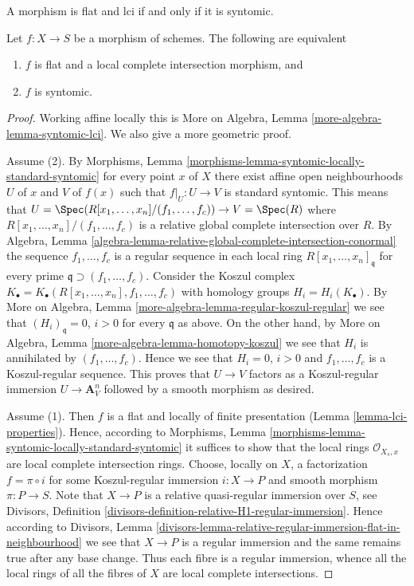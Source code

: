 \begin{lemma}
\label{lemma-flat-lci}
\begin{slogan}
A morphism is flat and lci if and only if it is syntomic.
\end{slogan}
Let $f : X \to S$ be a morphism of schemes.
The following are equivalent
\begin{enumerate}
\item $f$ is flat and a local complete intersection morphism, and
\item $f$ is syntomic.
\end{enumerate}
\end{lemma}

\begin{proof}
Working affine locally this is
More on Algebra, Lemma \ref{more-algebra-lemma-syntomic-lci}.
We also give a more geometric proof.

\medskip\noindent
Assume (2). By
Morphisms, Lemma \ref{morphisms-lemma-syntomic-locally-standard-syntomic}
for every point $x$ of $X$ there exist affine open neighbourhoods
$U$ of $x$ and $V$ of $f(x)$ such that $f|_U : U \to V$ is standard syntomic.
This means that $U = \Spec(R[x_1, \ldots, x_n]/(f_1, \ldots, f_c))
\to V = \Spec(R)$ where $R[x_1, \ldots, x_n]/(f_1, \ldots, f_c)$ is a
relative global complete intersection over $R$. By
Algebra,
Lemma \ref{algebra-lemma-relative-global-complete-intersection-conormal}
the sequence $f_1, \ldots, f_c$ is a regular sequence in each local
ring $R[x_1, \ldots, x_n]_{\mathfrak q}$ for every prime
$\mathfrak q \supset (f_1, \ldots, f_c)$. Consider the Koszul complex
$K_\bullet = K_\bullet(R[x_1, \ldots, x_n], f_1, \ldots, f_c)$
with homology groups $H_i = H_i(K_\bullet)$. By
More on Algebra, Lemma \ref{more-algebra-lemma-regular-koszul-regular}
we see that $(H_i)_{\mathfrak q} = 0$, $i > 0$ for every $\mathfrak q$
as above. On the other hand, by
More on Algebra, Lemma \ref{more-algebra-lemma-homotopy-koszul}
we see that $H_i$ is annihilated by $(f_1, \ldots, f_c)$. Hence we
see that $H_i = 0$, $i > 0$ and $f_1, \ldots, f_c$ is a Koszul-regular
sequence. This proves that $U \to V$ factors as a Koszul-regular
immersion $U \to \mathbf{A}^n_V$ followed by a smooth morphism as desired.

\medskip\noindent
Assume (1). Then $f$ is a flat and locally of finite presentation
(Lemma \ref{lemma-lci-properties}).
Hence, according to
Morphisms, Lemma \ref{morphisms-lemma-syntomic-locally-standard-syntomic}
it suffices to show that the local rings $\mathcal{O}_{X_s, x}$
are local complete intersection rings. Choose, locally on $X$, a factorization
$f = \pi \circ i$ for some Koszul-regular immersion $i : X \to P$
and smooth morphism $\pi : P \to S$. Note that $X \to P$ is
a relative quasi-regular immersion over $S$, see
Divisors, Definition \ref{divisors-definition-relative-H1-regular-immersion}.
Hence according to
Divisors,
Lemma \ref{divisors-lemma-relative-regular-immersion-flat-in-neighbourhood}
we see that $X \to P$ is a regular immersion and the same remains true
after any base change. Thus each fibre is a regular immersion, whence
all the local rings of all the fibres of $X$ are local complete intersections.
\end{proof}

